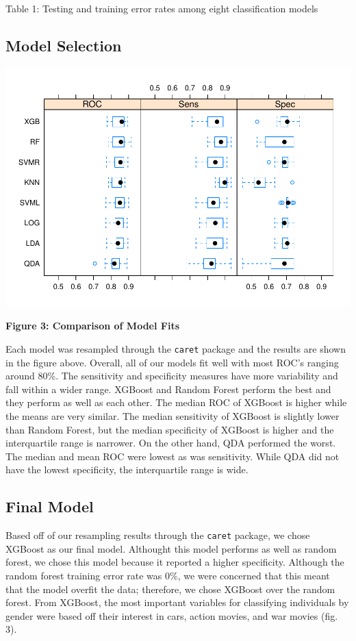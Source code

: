 \documentclass[]{article}
\begin{document}
Table 1: Testing and training error rates among eight classification
models

\subsection{Model Selection}\label{model-selection}

\includegraphics{final_report_files/figure-latex/unnamed-chunk-13-1.pdf}

\textbf{Figure 3: Comparison of Model Fits}

Each model was resampled through the \texttt{caret} package and the
results are shown in the figure above. Overall, all of our models fit
well with most ROC's ranging around 80\%. The sensitivity and
specificity measures have more variability and fall within a wider
range. XGBoost and Random Forest perform the best and they perform as
well as each other. The median ROC of XGBoost is higher while the means
are very similar. The median sensitivity of XGBoost is slightly lower
than Random Forest, but the median specificity of XGBoost is higher and
the interquartile range is narrower. On the other hand, QDA performed
the worst. The median and mean ROC were lowest as was sensitivity. While
QDA did not have the lowest specificity, the interquartile range is
wide.

\subsection{Final Model}\label{final-model}

Based off of our resampling results through the \texttt{caret} package,
we chose XGBoost as our final model. Althought this model performs as
well as random forest, we chose this model because it reported a higher
specificity. Although the random forest training error rate was 0\%, we
were concerned that this meant that the model overfit the data;
therefore, we chose XGBoost over the random forest. From XGBoost, the
most important variables for classifying individuals by gender were
based off their interest in cars, action movies, and war movies (fig.
3).
\end{document}
